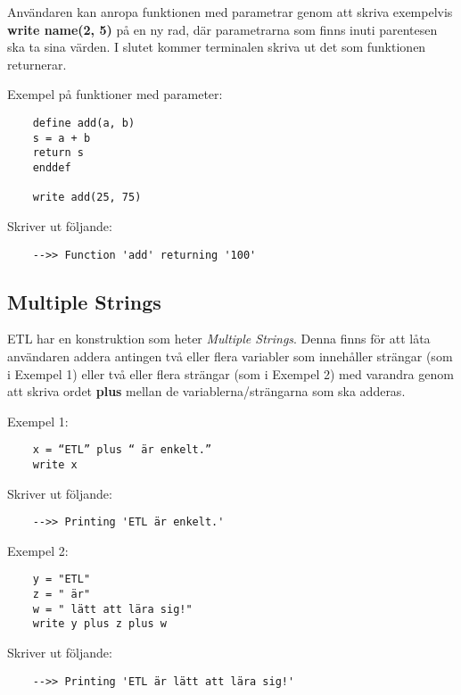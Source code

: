 \documentclass{TDP019mall}
\begin{document}
\begin{enumerate}
Användaren kan anropa funktionen med parametrar genom att skriva exempelvis \textbf{write name(2, 5)} på en ny rad, där parametrarna 
som finns inuti parentesen ska ta sina värden. I slutet kommer terminalen skriva ut det som funktionen returnerar.  
 
 
Exempel på funktioner med parameter:
\begin{verbatim}
    define add(a, b)
    s = a + b
    return s
    enddef

    write add(25, 75)
\end{verbatim}
Skriver ut följande:
\begin{verbatim}
    -->> Function 'add' returning '100'
\end{verbatim}
\end{enumerate}


\newpage
\subsection{Multiple Strings}
ETL har en konstruktion som heter \textit{Multiple Strings}. Denna finns för att låta användaren addera antingen två eller flera variabler som innehåller strängar 
(som i Exempel 1) eller två eller flera strängar (som i Exempel 2) med varandra genom att skriva ordet \textbf{plus} mellan de variablerna/strängarna som ska adderas.

Exempel 1: 
\begin{verbatim}
    x = “ETL” plus “ är enkelt.”
    write x
\end{verbatim}
Skriver ut följande:
\begin{verbatim}
    -->> Printing 'ETL är enkelt.'
\end{verbatim}

Exempel 2:

\begin{verbatim}
    y = "ETL"
    z = " är"
    w = " lätt att lära sig!"
    write y plus z plus w
\end{verbatim}
 
Skriver ut följande:
\begin{verbatim}
    -->> Printing 'ETL är lätt att lära sig!'
\end{verbatim}
\end{document}

